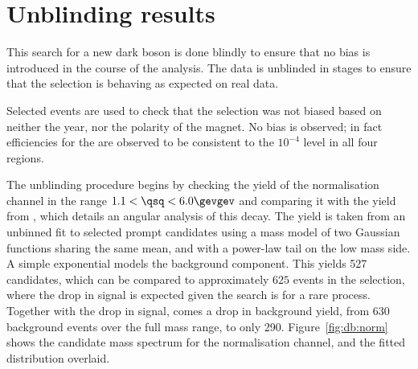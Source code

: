 \section{Unblinding results}

This search for a new dark boson is done blindly to ensure that no bias is introduced in the
course of the analysis.
The data is unblinded in stages to ensure that the selection is behaving as expected on real data.


Selected \decay{\Bd}{\jpsi\Kstarz} events are used to check that the selection was not biased
based on neither the year, nor the polarity of the \lhcb magnet.
No bias is observed; in fact
efficiencies for the \uBDT are observed to be consistent to the $10^{-4}$ level in all four regions.

The unblinding procedure begins by checking the yield of the normalisation channel
\btokstrmumu in the range $1.1<\qsq<6.0\gevgev$ and comparing it with the yield from
, which details an angular analysis of this decay.
The yield is taken from an unbinned fit to selected prompt \btokstrdb candidates using a mass model
of two Gaussian functions sharing the same mean, and with a power-law tail on the low mass side.
A simple exponential models the background component.
This yields 527 \Bd candidates, which can be compared to approximately $625$ events in the \sm
selection, where the drop in signal is expected given the search is for a rare process.
Together with the drop in signal, comes a drop in background yield, from \approx$630$ background
events over the full mass range, to only 290.
Figure~\ref{fig:db:norm} shows the \Bd candidate mass spectrum for the normalisation channel, and
the fitted distribution overlaid.


